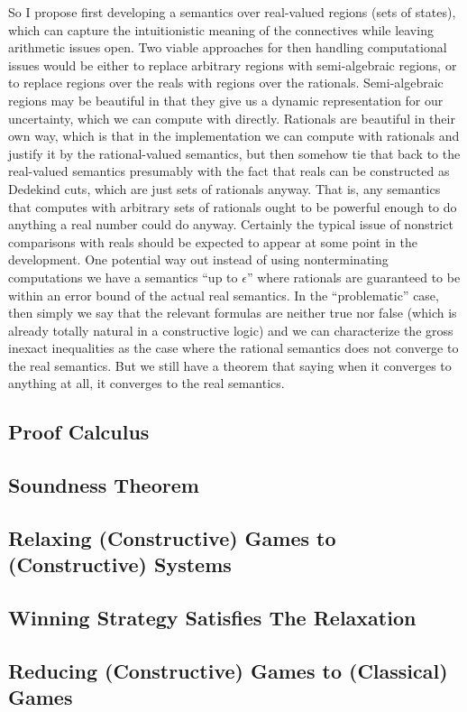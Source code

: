 \documentclass[12pt]{cmuthesis}
\theoremstyle{definition}
\theoremstyle{remark}
\begin{document}
So I propose first developing a semantics over real-valued regions (sets of states), which can capture the intuitionistic meaning of the connectives while leaving arithmetic issues open.
Two viable approaches for then handling computational issues would be either to replace arbitrary regions with semi-algebraic regions, or to replace regions over the reals with regions over the rationals.
Semi-algebraic regions may be beautiful in that they give us a dynamic representation for our uncertainty, which we can compute with directly.
Rationals are beautiful in their own way, which is that in the implementation we can compute with rationals and justify it by the rational-valued semantics, but then somehow tie that back to the real-valued semantics presumably with the fact that reals can be constructed as Dedekind cuts, which are just sets of rationals anyway.
That is, any semantics that computes with arbitrary sets of rationals ought to be powerful enough to do anything a real number could do anyway.
Certainly the typical issue of nonstrict comparisons with reals should be expected to appear at some point in the development.
One potential way out instead of using nonterminating computations we have a semantics ``up to $\epsilon$'' where rationals are guaranteed to be within an error bound of the actual real semantics.
In the ``problematic'' case, then simply we say that the relevant formulas are neither true nor false (which is already totally natural in a constructive logic) and we can characterize the gross inexact inequalities as the case where the rational semantics does not converge to the real semantics.
But we still have a theorem that saying when it converges to anything at all, it converges to the real semantics.
\subsection{Proof Calculus}
\subsection{Soundness Theorem}
\subsection{Relaxing (Constructive) Games to (Constructive) Systems}
\subsection{Winning Strategy Satisfies The Relaxation}
\subsection{Reducing (Constructive) Games to (Classical) Games}
\end{document}
